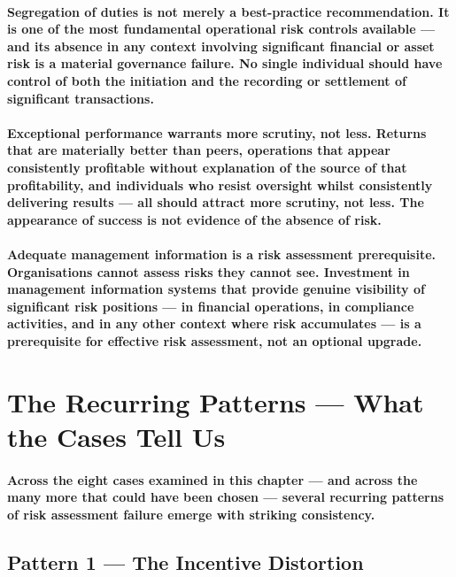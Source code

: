 \paragraph{\textbf{Segregation of duties is not merely a best-practice recommendation}. It is one of the most fundamental operational risk controls available — and its absence in any context involving significant financial or asset risk is a material governance failure. No single individual should have control of both the initiation and the recording or settlement of significant transactions.}
\paragraph{\textbf{Exceptional performance warrants more scrutiny, not less}. Returns that are materially better than peers, operations that appear consistently profitable without explanation of the source of that profitability, and individuals who resist oversight whilst consistently delivering results — all should attract more scrutiny, not less. The appearance of success is not evidence of the absence of risk.}
\paragraph{\textbf{Adequate management information is a risk assessment prerequisite}. Organisations cannot assess risks they cannot see. Investment in management information systems that provide genuine visibility of significant risk positions — in financial operations, in compliance activities, and in any other context where risk accumulates — is a prerequisite for effective risk assessment, not an optional upgrade.}

\section{The Recurring Patterns — What the Cases Tell Us}
\paragraph{Across the eight cases examined in this chapter — and across the many more that could have been chosen — several recurring patterns of risk assessment failure emerge with striking consistency.}

\subsection{Pattern 1 — The Incentive Distortion}
